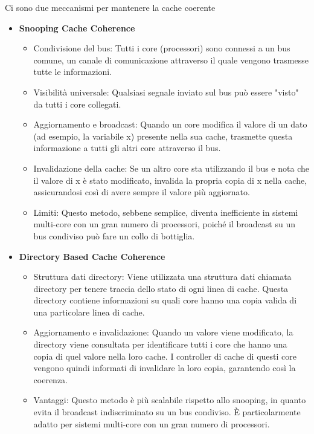 \documentclass[10pt, letterpaper]{report}
\begin{document}
Ci sono due meccanismi per mantenere la cache coerente\begin{itemize}
    \item \textbf{Snooping Cache Coherence}\begin{itemize}
        \item Condivisione del bus: Tutti i core (processori) sono connessi a un bus comune, un canale di comunicazione attraverso il quale vengono trasmesse tutte le informazioni.\item
        Visibilità universale: Qualsiasi segnale inviato sul bus può essere "visto" da tutti i core collegati.
        \item  Aggiornamento e broadcast: Quando un core modifica il valore di un dato (ad esempio, la variabile x) presente nella sua cache, trasmette questa informazione a tutti gli altri core attraverso il bus.
        \item  Invalidazione della cache: Se un altro core sta utilizzando  il bus e nota che il valore di x è stato modificato, invalida la propria copia di x nella cache, assicurandosi così di avere sempre il valore più aggiornato.
        \item  Limiti: Questo metodo, sebbene semplice, diventa inefficiente in sistemi multi-core con un gran numero di processori, poiché il broadcast su un bus condiviso può fare un collo di bottiglia.
    \end{itemize}
    \item \textbf{Directory Based Cache Coherence}\begin{itemize}
        \item Struttura dati directory: Viene utilizzata una struttura dati chiamata directory per tenere traccia dello stato di ogni linea di cache. Questa directory contiene informazioni su quali core hanno una copia valida di una particolare linea di cache.
        \item Aggiornamento e invalidazione: Quando un valore viene modificato, la directory viene consultata per identificare tutti i core che hanno una copia di quel valore nella loro cache. I controller di cache di questi core vengono quindi informati di invalidare la loro copia, garantendo così la coerenza.
        \item Vantaggi: Questo metodo è più scalabile rispetto allo snooping, in quanto evita il broadcast indiscriminato su un bus condiviso. È particolarmente adatto per sistemi multi-core con un gran numero di processori.
    \end{itemize}
\end{itemize}
\end{document}
